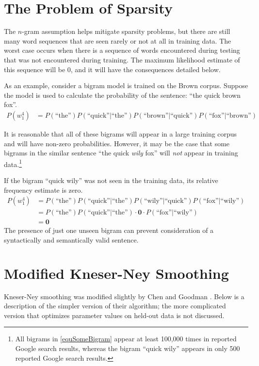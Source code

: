 \documentclass[10pt]{article}
\newcommand{\bs}[1]{\boldsymbol{#1}}
\newcommand{\ngram}{$n$-gram\xspace}
\newcommand{\prb}[1]{P\left(#1\right)}
\begin{document}
\section{The Problem of Sparsity}
The \ngram assumption helps mitigate sparsity problems, but there are still many word sequences that are seen rarely or not at all in training data.
The worst case occurs when there is a sequence of words encountered during testing that was not encountered during training.
The maximum likelihood estimate of this sequence will be $0$, and it will have the consequences detailed below.

As an example, consider a bigram model is trained on the Brown corpus.
Suppose the model is used to calculate the probability of the sentence: ``the quick brown fox''.
\begin{align}
\prb{w_1^4} &= P(\text{``the''}) P(\text{``quick''$|$``the''}) P(\text{``brown''$|$``quick''}) P(\text{``fox''$|$``brown''}) \label{equSomeBigram}
\end{align}

It is reasonable that all of these bigrams will appear in a large training corpus and will have non-zero probabilities.
However, it may be the case that some bigrams in the similar sentence ``the quick \emph{wily} fox'' will \emph{not} appear in training 
data.\footnote{All bigrams in \ref{equSomeBigram} appear at least 100,000 times in reported Google search results, whereas the bigram ``quick wily'' appears in only 500 reported Google search results.}

If the bigram ``quick wily'' was not seen in the training data, its relative frequency estimate is zero.
\begin{align}
\prb{w_1^4} &= P(\text{``the''}) P(\text{``quick''$|$``the''}) P(\text{``wily''$|$``quick''}) P(\text{``fox''$|$``wily''}) \label{equZeroBigram} \\
&= P(\text{``the''}) P(\text{``quick''$|$``the''}) \cdot \bs{0} \cdot P(\text{``fox''$|$``wily''}) \\
&= \bs{0}
\end{align}
The presence of just one unseen bigram can prevent consideration of a syntactically and semantically valid sentence.


\section{Modified Kneser-Ney Smoothing}
Kneser-Ney smoothing \cite{kneser1995improved} was modified slightly by Chen and Goodman \cite{chen1998empirical}.
Below is a description of the simpler version of their algorithm; the more complicated version that optimizes parameter values on held-out data is not discussed.
\end{document}
